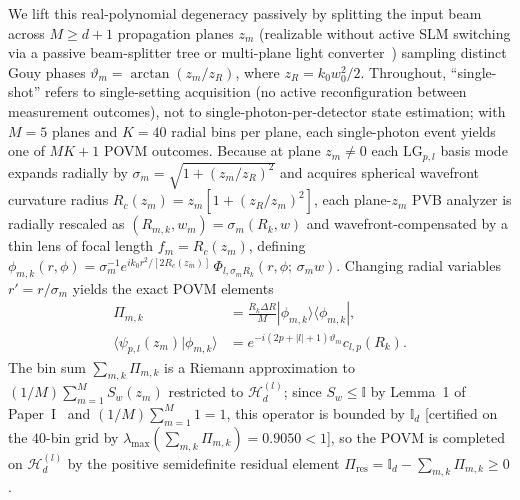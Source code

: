 \documentclass[aps,pra,reprint,nofootinbib,floatfix,longbibliography]{revtex4-2}
\newcommand{\braket}[2]{\langle #1 | #2 \rangle}
\newcommand{\ket}[1]{| #1 \rangle}
\newcommand{\bra}[1]{\langle #1 |}
\newcommand{\abs}[1]{\lvert #1 \rvert}
\begin{document}
We lift this real-polynomial degeneracy passively by splitting the input beam across $M \ge d+1$ propagation planes $z_m$ (realizable without active SLM switching via a passive beam-splitter tree or multi-plane light converter~\cite{Fontaine2019,Bouchard2018}) sampling distinct Gouy phases $\vartheta_m = \arctan(z_m/z_R)$, where $z_R = k_0 w_0^2/2$. Throughout, ``single-shot'' refers to single-setting acquisition (no active reconfiguration between measurement outcomes), not to single-photon-per-detector state estimation; with $M = 5$ planes and $K = 40$ radial bins per plane, each single-photon event yields one of $MK + 1$ POVM outcomes. Because at plane $z_m \neq 0$ each $\mathrm{LG}_{p,l}$ basis mode expands radially by $\sigma_m = \sqrt{1 + (z_m/z_R)^2}$ and acquires spherical wavefront curvature radius $R_c(z_m) = z_m[1 + (z_R/z_m)^2]$, each plane-$z_m$ PVB analyzer is radially rescaled as $(R_{m,k}, w_m) = \sigma_m(R_k, w)$ and wavefront-compensated by a thin lens of focal length $f_m = R_c(z_m)$, defining $\phi_{m,k}(r,\phi) = \sigma_m^{-1} e^{ik_0 r^2/[2R_c(z_m)]}\,\Phi_{l,\sigma_m R_k}(r,\phi;\,\sigma_m w)$. Changing radial variables $r' = r/\sigma_m$ yields the exact POVM elements~\cite{Renes2004}
\begin{align}
\Pi_{m,k} &= \frac{R_k \Delta R}{M}\ket{\phi_{m,k}}\bra{\phi_{m,k}}, \nonumber \\
\braket{\psi_{p,l}(z_m)}{\phi_{m,k}} &= e^{-i(2p+\abs{l}+1)\vartheta_m} c_{l,p}(R_k).
\label{eq:ic_povm_elements}
\end{align}
The bin sum $\sum_{m,k}\Pi_{m,k}$ is a Riemann approximation to $(1/M)\sum_{m=1}^M S_w(z_m)$ restricted to $\mathcal{H}_d^{(l)}$; since $S_w \le \mathbb{I}$ by Lemma~1 of Paper~I~\cite{AyalaPaperI} and $(1/M)\sum_{m=1}^M 1 = 1$, this operator is bounded by $\mathbb{I}_d$ [certified on the $40$-bin grid by $\lambda_{\max}(\sum_{m,k}\Pi_{m,k}) = 0.9050 < 1$], so the POVM is completed on $\mathcal{H}_d^{(l)}$ by the positive semidefinite residual element $\Pi_{\mathrm{res}} = \mathbb{I}_d - \sum_{m,k}\Pi_{m,k} \ge 0$.
\end{document}

